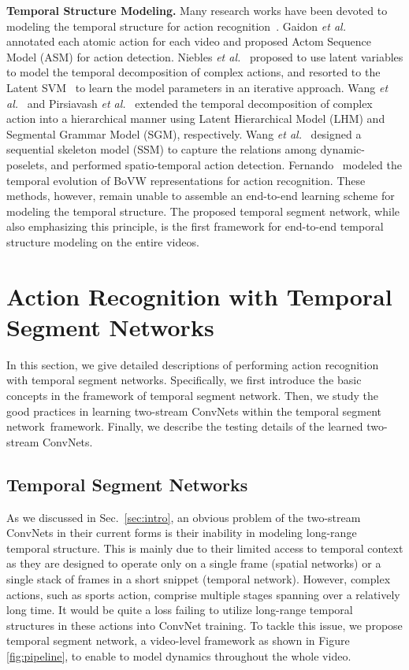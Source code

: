 \documentclass[runningheads]{llncs}
\newcommand{\SEGNET}{temporal segment network}
\begin{document}
\textbf{Temporal Structure Modeling.} 
Many research works have been devoted to modeling the temporal structure for action recognition~\cite{NieblesCF10,GaidonHS13,WangQT14a,PirsiavashR14,WangQT14b,FernandoGMGT15}. Gaidon \emph{et al.}~\cite{GaidonHS13} annotated each atomic action for each video and proposed Actom Sequence Model (ASM) for action detection. Niebles \emph{et al.}~\cite{NieblesCF10} proposed to use latent variables to model the temporal decomposition of complex actions, and resorted to the Latent SVM~\cite{FelzenszwalbGMR10} to learn the model parameters in an iterative approach. Wang \emph{et al.}~\cite{WangQT14a} and Pirsiavash \emph{et al.}~\cite{PirsiavashR14} extended the temporal decomposition of complex action into a hierarchical manner using Latent Hierarchical Model (LHM) and Segmental Grammar Model (SGM), respectively. Wang \emph{et al.}~\cite{WangQT14b} designed a sequential skeleton model (SSM) to capture the relations among dynamic-poselets, and performed spatio-temporal action detection. Fernando~\cite{FernandoGMGT15} modeled the temporal evolution of BoVW representations for action recognition. 
These methods, however, remain unable to assemble an end-to-end learning scheme for modeling the temporal structure. The proposed temporal segment network, while also emphasizing this principle, is the first framework for end-to-end temporal structure modeling on the entire videos.

\section{Action Recognition with Temporal Segment Networks}
\label{sec:vds}

In this section, we give detailed descriptions of performing action recognition with \SEGNET s.
Specifically, we first introduce the basic concepts in the framework of \SEGNET. 
Then, we study the good practices in learning two-stream ConvNets within the \SEGNET~framework. Finally, we describe the testing details of the learned two-stream ConvNets.

\subsection{Temporal Segment Networks}\label{sec:seg}

As we discussed in Sec.~\ref{sec:intro}, an obvious problem of the two-stream ConvNets in their current forms is their inability in modeling long-range temporal structure.
This is mainly due to their limited access to temporal context as they are designed to operate only on a single frame (spatial networks) or a single stack of frames in a short snippet (temporal network).
However, complex actions, such as sports action, comprise multiple stages spanning over a relatively long time. 
It would be quite a loss failing to utilize long-range temporal structures in these actions into ConvNet training.
To tackle this issue, we propose \SEGNET, a video-level framework as shown in Figure \ref{fig:pipeline}, to enable to model dynamics throughout the whole video.
\end{document}
